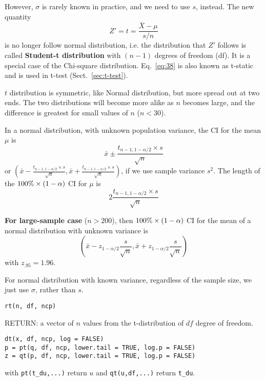 However, $\sigma$ is rarely known in practice, and we need to use $s$,
instead. The new quantity
\begin{equation}
  \label{eq:38}
  Z' = t = \frac{\bar{X}-\mu}{s/n}
\end{equation}
is no longer follow normal distribution, i.e.  the distribution that
$Z'$ follows is called {\bf Student-t distribution} with $(n-1)$
degrees of freedom (df). It is a special case of the Chi-square
distribution. %
Eq.~\eqref{eq:38} is also known as t-static and is used in t-test
(Sect.~\ref{sec:t-test}). 

\begin{framed}
  $t$ distribution is symmetric, like Normal distribution, but more
  spread out at two ends. The two distributions will become more alike
  as $n$ becomes large, and the difference is greatest for small
  values of $n$ ($n < 30$). 
\end{framed}

In a normal distribution, with unknown population variance, the CI for
the mean $\mu$ is
\begin{equation}
  \label{eq:26}
  \bar{x} \pm \frac{t_{n-1,1-\alpha/2} \times s}{\sqrt{n}}
\end{equation}
or $\left( \bar{x} - \frac{t_{n-1,1-\alpha/2}\times s}{\sqrt{n}}, \bar{x}
  + \frac{t_{n-1,1-\alpha/2}\times s}{\sqrt{n}}\right)$, if we use sample
variance $s^2$. The length of the $100\%\times (1-\alpha)$ CI for $\mu$ is 
\begin{equation*}
  2\frac{t_{n-1,1-\alpha/2}\times s}{\sqrt{n}}
\end{equation*}


{\bf For large-sample case} ($n > 200$), then $100\%\times (1-\alpha)$ CI for
the mean of a normal distribution with unknown variance is
\begin{equation}
  \label{eq:32}
  \left( \bar{x} - z_{1-\alpha/2} \frac{s}{\sqrt{n}}, \bar{x}
    +  z_{1-\alpha/2} \frac{s}{\sqrt{n}}\right)
\end{equation}
with $z_{.95}=1.96$. 


For normal distribution with known variance, regardless of the sample
size, we just use $\sigma$, rather than $s$. 

\begin{verbatim}
rt(n, df, ncp)
\end{verbatim}
RETURN: a vector of $n$ values from the t-distribution of $df$ degree of
freedom.

\begin{verbatim}
dt(x, df, ncp, log = FALSE)
p = pt(q, df, ncp, lower.tail = TRUE, log.p = FALSE)
z = qt(p, df, ncp, lower.tail = TRUE, log.p = FALSE)
\end{verbatim}
with \verb!pt(t_du,...)! return $u$ and \verb!qt(u,df,...)! return
\verb!t_du!.

